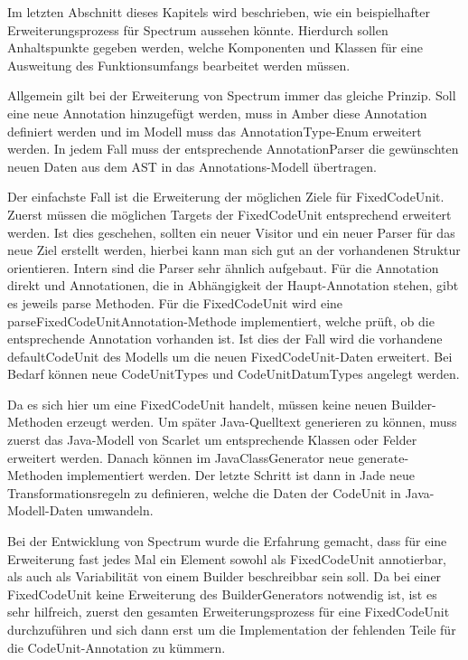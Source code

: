 \documentclass[12pt,oneside,a4paper,parskip]{scrbook}
\begin{document}
Im letzten Abschnitt dieses Kapitels wird beschrieben, wie ein beispielhafter Erweiterungsprozess für Spectrum aussehen könnte. Hierdurch sollen Anhaltspunkte gegeben werden, welche Komponenten und Klassen für eine Ausweitung des Funktionsumfangs bearbeitet werden müssen.

Allgemein gilt bei der Erweiterung von Spectrum immer das gleiche Prinzip. Soll eine neue Annotation hinzugefügt werden, muss in Amber diese Annotation definiert werden und im Modell muss das AnnotationType-Enum erweitert werden. In jedem Fall muss der entsprechende AnnotationParser die gewünschten neuen Daten aus dem AST in das Annotations-Modell übertragen.

Der einfachste Fall ist die Erweiterung der möglichen Ziele für FixedCodeUnit. Zuerst müssen die möglichen Targets der FixedCodeUnit entsprechend erweitert werden. Ist dies geschehen, sollten ein neuer Visitor und ein neuer Parser für das neue Ziel erstellt werden, hierbei kann man sich gut an der vorhandenen Struktur orientieren. Intern sind die Parser sehr ähnlich aufgebaut. Für die Annotation direkt und Annotationen, die in Abhängigkeit der Haupt-Annotation stehen, gibt es jeweils parse Methoden. Für die FixedCodeUnit wird eine parseFixedCodeUnitAnnotation-Methode implementiert, welche prüft, ob die entsprechende Annotation vorhanden ist. Ist dies der Fall wird die vorhandene defaultCodeUnit des Modells um die neuen FixedCodeUnit-Daten erweitert. Bei Bedarf können neue CodeUnitTypes und CodeUnitDatumTypes angelegt werden.

Da es sich hier um eine FixedCodeUnit handelt, müssen keine neuen Builder-Methoden erzeugt werden. Um später Java-Quelltext generieren zu können, muss zuerst das Java-Modell von Scarlet um entsprechende Klassen oder Felder erweitert werden. Danach können im JavaClassGenerator neue generate-Methoden implementiert werden. Der letzte Schritt ist dann in Jade neue Transformationsregeln zu definieren, welche die Daten der CodeUnit in Java-Modell-Daten umwandeln.

Bei der Entwicklung von Spectrum wurde die Erfahrung gemacht, dass für eine Erweiterung fast jedes Mal ein Element sowohl als FixedCodeUnit annotierbar, als auch als Variabilität von einem Builder beschreibbar sein soll. Da bei einer FixedCodeUnit keine Erweiterung des BuilderGenerators notwendig ist, ist es sehr hilfreich, zuerst den gesamten Erweiterungsprozess für eine FixedCodeUnit durchzuführen und sich dann erst um die Implementation der fehlenden Teile für die CodeUnit-Annotation zu kümmern.
\end{document}

